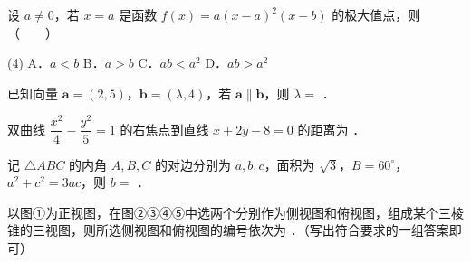\begin{question}
设 $a\ne0$，若 $x=a$ 是函数 $f(x)=a(x-a)^2(x-b)$ 的极大值点，则\mbox{（　　）}

\begin{gkopts}(4)
\task A．$a<b$
\task B．$a>b$
\task C．$ab<a^2$
\task D．$ab>a^2$
\end{gkopts}

\enlargethispage{2cm}

\end{question}

\begin{question}
已知向量 $\boldsymbol a=(2,5)$，$\boldsymbol b=(\lambda,4)$，若 $\boldsymbol a\parallel\boldsymbol b$，则 $\lambda=$ \gkblank{}．

\end{question}
\begin{question}
双曲线 $\dfrac{x^2}{4}-\dfrac{y^2}{5}=1$ 的右焦点到直线 $x+2y-8=0$ 的距离为 \gkblank{}．

\end{question}
\begin{question}
记 $\triangle ABC$ 的内角 $A,B,C$ 的对边分别为 $a,b,c$，面积为 $\sqrt3$，$B=60^\circ$，$a^2+c^2=3ac$，则 $b=$ \gkblank{}．

\Needspace{0.4\textheight}
\end{question}
\begin{question}
以图①为正视图，在图②③④⑤中选两个分别作为侧视图和俯视图，组成某个三棱锥的三视图，则所选侧视图和俯视图的编号依次为 \gkblank{}．（写出符合要求的一组答案即可）
\nopagebreak[4]
\begin{center}\end{center}
\nopagebreak[4]
\end{question}

